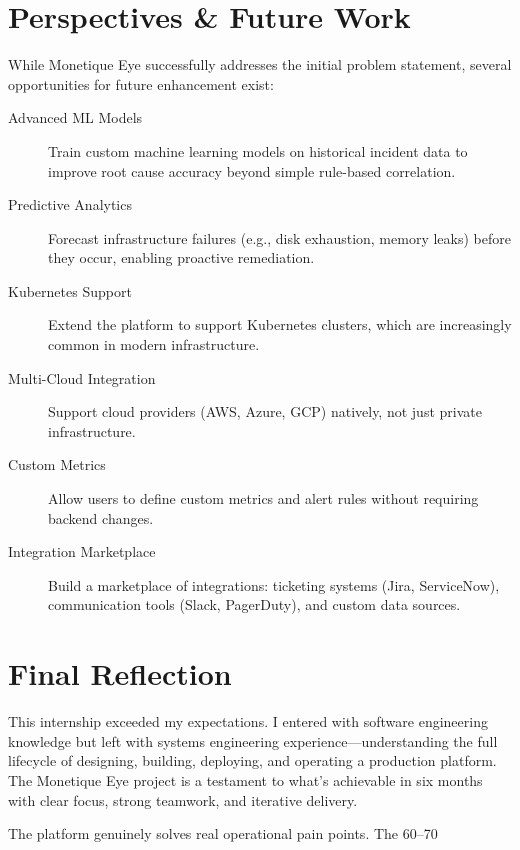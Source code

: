 \documentclass[12pt,a4paper]{report}
\begin{document}
\section*{Perspectives \& Future Work}

While Monetique Eye successfully addresses the initial problem statement, several opportunities for future enhancement exist:

\begin{description}
  \item[Advanced ML Models] Train custom machine learning models on historical incident data to improve root cause accuracy beyond simple rule-based correlation.
  
  \item[Predictive Analytics] Forecast infrastructure failures (e.g., disk exhaustion, memory leaks) before they occur, enabling proactive remediation.
  
  \item[Kubernetes Support] Extend the platform to support Kubernetes clusters, which are increasingly common in modern infrastructure.
  
  \item[Multi-Cloud Integration] Support cloud providers (AWS, Azure, GCP) natively, not just private infrastructure.
  
  \item[Custom Metrics] Allow users to define custom metrics and alert rules without requiring backend changes.
  
  \item[Integration Marketplace] Build a marketplace of integrations: ticketing systems (Jira, ServiceNow), communication tools (Slack, PagerDuty), and custom data sources.
\end{description}

\section*{Final Reflection}

This internship exceeded my expectations. I entered with software engineering knowledge but left with systems engineering experience—understanding the full lifecycle of designing, building, deploying, and operating a production platform. The Monetique Eye project is a testament to what's achievable in six months with clear focus, strong teamwork, and iterative delivery.

The platform genuinely solves real operational pain points. The 60–70%
\end{document}
